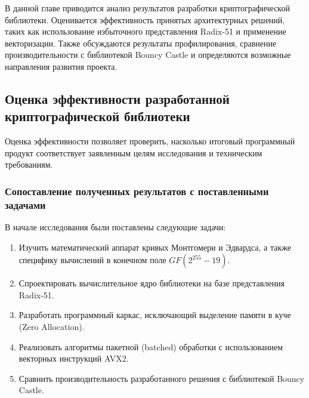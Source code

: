 В данной главе приводится анализ результатов разработки криптографической библиотеки. Оценивается эффективность принятых архитектурных решений, таких как использование избыточного представления Radix-51 и применение векторизации. Также обсуждаются результаты профилирования, сравнение производительности с библиотекой Bouncy Castle и определяются возможные направления развития проекта.

\subsection{Оценка эффективности разработанной криптографической библиотеки}

Оценка эффективности позволяет проверить, насколько итоговый программный продукт соответствует заявленным целям исследования и техническим требованиям.

\subsubsection{Сопоставление полученных результатов с поставленными задачами}

В начале исследования были поставлены следующие задачи:
\begin{enumerate}
    \item Изучить математический аппарат кривых Монтгомери и Эдвардса, а также специфику вычислений в конечном поле $GF(2^{255}-19)$.
    \item Спроектировать вычислительное ядро библиотеки на базе представления Radix-51.
    \item Разработать программный каркас, исключающий выделение памяти в куче (Zero Allocation).
    \item Реализовать алгоритмы пакетной (batched) обработки с использованием векторных инструкций AVX2.
    \item Сравнить производительность разработанного решения с библиотекой Bouncy Castle.
\end{enumerate}


